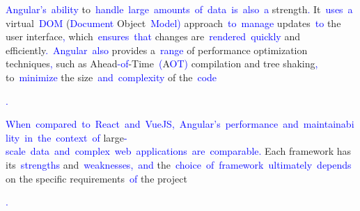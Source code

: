 \documentclass{article}
\begin{document}
\begin{tcolorbox}[colframe=black,colback=white]
{}\textcolor{blue}{Angular}\textcolor{blue}{'s}\textcolor{blue}{~ability} to\textcolor{blue}{~handle}\textcolor{blue}{~large}\textcolor{blue}{~amounts}\textcolor{blue}{~of}\textcolor{blue}{~data}\textcolor{blue}{~is}\textcolor{blue}{~also}\textcolor{blue}{~a} strength\textcolor{blue}{.} It\textcolor{blue}{~uses}\textcolor{blue}{~a} virtual\textcolor{blue}{~DOM} (\textcolor{blue}{Document} Object\textcolor{blue}{~Model}\textcolor{blue}{)} approach\textcolor{blue}{~to}\textcolor{blue}{~manage} updates\textcolor{blue}{~to} the user interface\textcolor{blue}{,} which\textcolor{blue}{~ensures}\textcolor{blue}{~that} changes are\textcolor{blue}{~rendered}\textcolor{blue}{~quickly} and efficiently\textcolor{blue}{.}\textcolor{blue}{~Angular}\textcolor{blue}{~also} provides a\textcolor{blue}{~range} of performance optimization techniques\textcolor{blue}{,} such as Ahead\textcolor{blue}{-of}-Time\textcolor{blue}{~(}A\textcolor{blue}{OT}\textcolor{blue}{)} compilation and tree shaking\textcolor{blue}{,} to\textcolor{blue}{~minimize} the size\textcolor{blue}{~and}\textcolor{blue}{~complexity} of the\textcolor{blue}{~code}\textcolor{blue}{.

}\textcolor{blue}{When}\textcolor{blue}{~compared}\textcolor{blue}{~to}\textcolor{blue}{~React}\textcolor{blue}{~and}\textcolor{blue}{~Vue}\textcolor{blue}{JS}\textcolor{blue}{,}\textcolor{blue}{~Angular}\textcolor{blue}{'s}\textcolor{blue}{~performance}\textcolor{blue}{~and}\textcolor{blue}{~maintain}\textcolor{blue}{ability}\textcolor{blue}{~in}\textcolor{blue}{~the}\textcolor{blue}{~context}\textcolor{blue}{~of} large\textcolor{blue}{-scale}\textcolor{blue}{~data}\textcolor{blue}{~and}\textcolor{blue}{~complex}\textcolor{blue}{~web}\textcolor{blue}{~applications}\textcolor{blue}{~are}\textcolor{blue}{~comparable}\textcolor{blue}{.} Each framework has its\textcolor{blue}{~strengths} and\textcolor{blue}{~weaknesses}\textcolor{blue}{,}\textcolor{blue}{~and} the\textcolor{blue}{~choice}\textcolor{blue}{~of}\textcolor{blue}{~framework}\textcolor{blue}{~ultimately}\textcolor{blue}{~depends} on the specific requirements\textcolor{blue}{~of} the project\textcolor{blue}{.

}
\end{tcolorbox}
\end{document}
